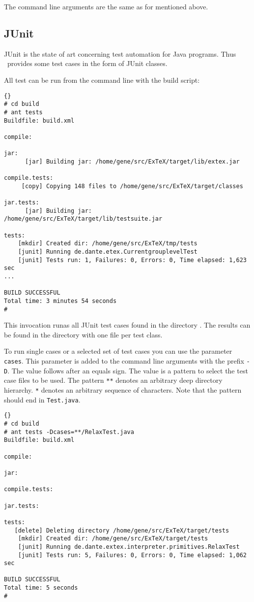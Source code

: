 The command line arguments are the same as for  mentioned
above.


\subsection{JUnit}\label{sec:shell-junit}

JUnit is the state of art concerning test automation for Java
programs. Thus \ExTeX\ provides some test cases in the form of JUnit
classes.

All test can be run from the command line with the build script:

\begin{lstlisting}{}
# cd build
# ant tests
Buildfile: build.xml

compile:

jar:
      [jar] Building jar: /home/gene/src/ExTeX/target/lib/extex.jar

compile.tests:
     [copy] Copying 148 files to /home/gene/src/ExTeX/target/classes

jar.tests:
      [jar] Building jar: /home/gene/src/ExTeX/target/lib/testsuite.jar

tests:
    [mkdir] Created dir: /home/gene/src/ExTeX/tmp/tests
    [junit] Running de.dante.etex.CurrentgrouplevelTest
    [junit] Tests run: 1, Failures: 0, Errors: 0, Time elapsed: 1,623 sec
...

BUILD SUCCESSFUL
Total time: 3 minutes 54 seconds
#
\end{lstlisting}

This invocation runas all JUnit test cases found in the directory
. The results can be found in the directory
 with one file per test class.

To run single cases or a selected set of test cases you can use the
parameter \texttt{cases}. This parameter is added to the command line
arguments with the prefix \verb|-D|. The value follows after an equals
sign. The value is a pattern to select the test case files to be used.
The pattern \verb|**| denotes an arbitrary deep directory hierarchy.
\verb|*| denotes an arbitrary sequence of characters. Note that the
pattern should end in \verb|Test.java|.

\begin{lstlisting}{}
# cd build
# ant tests -Dcases=**/RelaxTest.java
Buildfile: build.xml

compile:

jar:

compile.tests:

jar.tests:

tests:
   [delete] Deleting directory /home/gene/src/ExTeX/target/tests
    [mkdir] Created dir: /home/gene/src/ExTeX/target/tests
    [junit] Running de.dante.extex.interpreter.primitives.RelaxTest
    [junit] Tests run: 5, Failures: 0, Errors: 0, Time elapsed: 1,062 sec

BUILD SUCCESSFUL
Total time: 5 seconds
#
\end{lstlisting}

